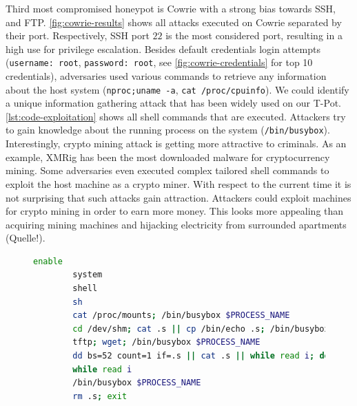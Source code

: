 Third most compromised honeypot is Cowrie with a strong bias towards SSH, and FTP.
\autoref{fig:cowrie-results} shows all attacks executed on Cowrie separated by their port.
Respectively, SSH port $22$ is the most considered port, resulting in a high use for privilege escalation.
Besides default credentials login attempts (\verb|username: root|, \verb|password: root|, see \autoref{fig:cowrie-credentials} for top 10 credentials), adversaries used various commands to retrieve any information about the host system (\verb|nproc;uname -a|, \verb|cat /proc/cpuinfo|).
We could identify a unique information gathering attack that has been widely used on our T-Pot.
\autoref{lst:code-exploitation} shows all shell commands that are executed.
Attackers try to gain knowledge about the running process on the system (\verb|/bin/busybox|).
Interestingly, crypto mining attack is getting more attractive to criminals.
As an example, XMRig has been the most downloaded malware for cryptocurrency mining.
Some adversaries even executed complex tailored shell commands to exploit the host machine as a crypto miner.
With respect to the current time it is not surprising that such attacks gain attraction.
Attackers could exploit machines for crypto mining in order to earn more money.
This looks more appealing than acquiring mining machines and hijacking electricity from surrounded apartments (Quelle!). 

\begin{figure}
    \begin{lstlisting}[language=bash,caption={Cowrie information gathering}, label={lst:code-exploitation}]
        enable
        system
        shell
        sh
        cat /proc/mounts; /bin/busybox $PROCESS_NAME
        cd /dev/shm; cat .s || cp /bin/echo .s; /bin/busybox $PROCESS_NAME
        tftp; wget; /bin/busybox $PROCESS_NAME
        dd bs=52 count=1 if=.s || cat .s || while read i; do echo $i; done < .s
        while read i
        /bin/busybox $PROCESS_NAME
        rm .s; exit
    \end{lstlisting}
\end{figure}

\begin{figure}
    
\end{figure}

